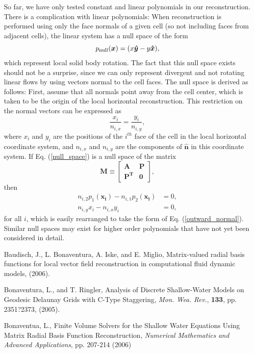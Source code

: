 \documentclass[onecolumn, referee]{svjour3}                     %
\begin{document}
So far, we have only tested constant and linear polynomials in our reconstruction.  There is a complication with linear
polynomials: When reconstruction is performed using only the face normals of a given cell (so not including faces from adjacent 
cells), the linear system has a null space of the form
\begin{equation}\label{null_space}
  p_{\rm null}(\bm{x}) = (x \bm{\hat{y}} - y \bm{\hat{x}}),
\end{equation}
which represent local solid body rotation.  The fact that this null space exists should not be a surprise, since we can only represent divergent and not rotating linear flows by using vectors normal to the cell faces.  The null space is derived as follows:
First, assume that all normals point away from the cell center, which is taken to be the origin of the local horizontal reconstruction.  This restriction on the normal vectors can be expressed as
\begin{equation} \label{outward_normal}
  \frac{x_i}{n_{i,x}} = \frac{y_i}{n_{i,y}}, 
\end{equation}
where $x_i$ and $y_i$ are the positions of the $i^{th}$ face of the cell in the local horizontal coordinate system, and $n_{i,x}$ and $n_{i,y}$ are the components of $\bm{\hat{n}}$ in this coordinate system.  If Eq. (\ref{null_space}) is a null space of the matrix
\begin{equation}
  \bm{M} \equiv \left[
  \begin{array}{cc}
     \bm{A} & \bm{P} \\
     \bm{P^T} & \bm{0} 
  \end{array}
  \right],
\end{equation}
then 
\begin{align}
  n_{i,2} p_1(\bm{x_i}) - n_{i,1} p_2(\bm{x_i}) & = 0, \\
  n_{i,y} x_i - n_{i,x} y_i & = 0,
\end{align}
for all $i$,  which is easily rearranged to take the form of Eq. (\ref{outward_normal}).
Similar null spaces may exist for higher order polynomials that have not yet been considered in detail.



\begin{thebibliography}{} 



 {\sc Baudisch, J., L. Bonaventura, A. Iske, and E. Miglio},
	 Matrix-valued radial basis functions for local vector field reconstruction in computational fluid dynamic models, 
	 (2006).
	 
 {\sc Bonaventura, L., and T. Ringler},
        Analysis of Discrete Shallow-Water Models on Geodesic Delaunay Grids with C-Type Staggering,
        {\em Mon. Wea. Rev.}, {\bf 133}, pp. 2351?2373, (2005).

 {\sc Bonaventua, L., }
		Finite Volume Solvers for the Shallow Water Equations Using Matrix Radial Basis Function Reconstruction,
		{\em Numerical Mathematics and Advanced Applications}, pp. 207-214 (2006)

\end{thebibliography}
\end{document}
